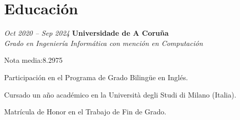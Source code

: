 \section{Educación}

\begin{twocolentry}{
    \textit{Oct 2020 – Sep 2024}}
    \textbf{Universidade de A Coruña} \\
    \textit{Grado en Ingeniería Informática con mención en Computación}
\end{twocolentry}

\vspace{0.10 cm}
\begin{onecolentry}
    \begin{highlights}
        \item Nota media:\@ 8.2975
        \item Participación en el Programa de Grado Bilingüe en Inglés.
        \item Cursado un año académico en la Università degli Studi di Milano (Italia).
        \item Matrícula de Honor en el Trabajo de Fin de Grado.
    \end{highlights}
\end{onecolentry}